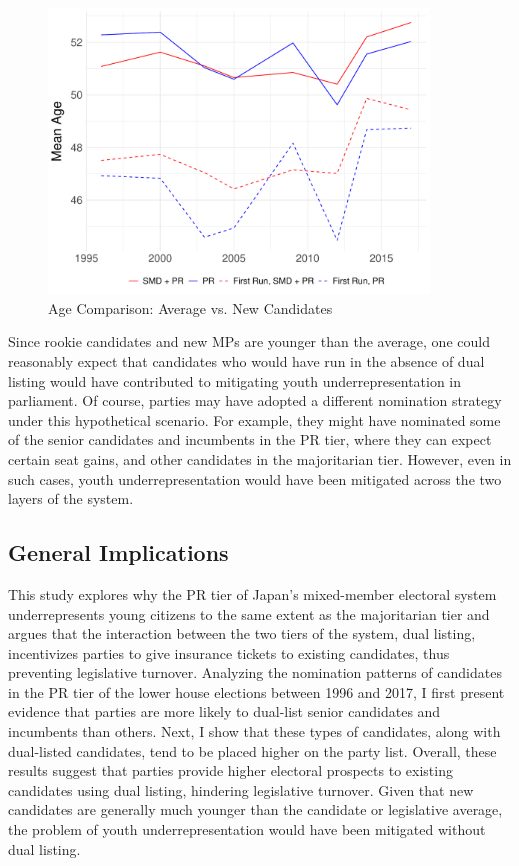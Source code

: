\documentclass[a4paper, 11pt]{article}
\begin{document}
\begin{figure}[!htbp]
	\includegraphics[width = 0.9\textwidth]{../figure/paper/age_first_run.pdf}
	\caption{Age Comparison: Average vs. New Candidates}
	\label{fig:ageFirstRun}
\end{figure}

Since rookie candidates and new MPs are younger than the average, one could reasonably expect that candidates who would have run in the absence of dual listing would have contributed to mitigating youth underrepresentation in parliament. Of course, parties may have adopted a different nomination strategy under this hypothetical scenario. For example, they might have nominated some of the senior candidates and incumbents in the PR tier, where they can expect certain seat gains, and other candidates in the majoritarian tier. However, even in such cases, youth underrepresentation would have been mitigated across the two layers of the system. 

\subsection{General Implications}

This study explores why the PR tier of Japan's mixed-member electoral system underrepresents young citizens to the same extent as the majoritarian tier and argues that the interaction between the two tiers of the system, dual listing, incentivizes parties to give insurance tickets to existing candidates, thus preventing legislative turnover. Analyzing the nomination patterns of candidates in the PR tier of the lower house elections between 1996 and 2017, I first present evidence that parties are more likely to dual-list senior candidates and incumbents than others. Next, I show that these types of candidates, along with dual-listed candidates, tend to be placed higher on the party list. Overall, these results suggest that parties provide higher electoral prospects to existing candidates using dual listing, hindering legislative turnover. Given that new candidates are generally much younger than the candidate or legislative average, the problem of youth underrepresentation would have been mitigated without dual listing. 
\end{document}

